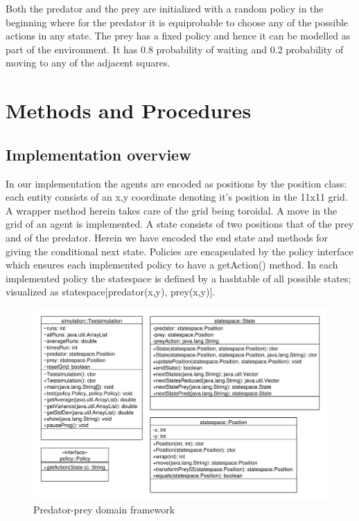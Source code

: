 \documentclass[paper=a4, fontsize=11pt]{scrartcl}
\numberwithin{equation}{section}		%
\numberwithin{figure}{section}			%
\numberwithin{table}{section}				%
\begin{document}
Both the predator and the prey are initialized with a random policy in the beginning where for the predator it is equiprobable to choose any of the possible actions %
in any state. The prey has a fixed policy and hence it can be modelled as part of the environment. It has 0.8 probability of waiting and 0.2 probability of moving to any of the adjacent squares.

\section{Methods and Procedures}
\label{methods}
\subsection{Implementation overview}
In our implementation the agents are encoded as positions by the position class: each entity consists of an x,y coordinate denoting it's position in the 11x11 grid. A wrapper method herein takes care of the grid being toroidal. A move in the grid of an agent is implemented. A state consists of two positions that of the prey and of the predator. Herein we have encoded the end state and methods for giving the conditional next state. Policies are encapsulated by the policy interface which ensures each implemented policy to have a getAction() method. In each implemented policy the statespace is defined by a hashtable of all possible states; visualized as statespace[predator(x,y), prey(x,y)].
\begin{figure}[H] \centering
\includegraphics[scale=0.6]{uml_general.pdf}
\caption{Predator-prey domain framework} \label{Predator-prey domain framework}
\end{figure}
\end{document}
